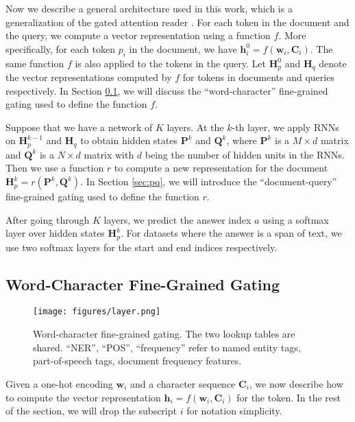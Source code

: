 \documentclass{article} \usepackage{iclr2017_conference,times}
\begin{document}
Now we describe a general architecture used in this work, which is a generalization of the gated attention reader \citep{dhingra2016gated}. For each token in the document and the query, we compute a vector representation using a function $f$. More specifically, for each token $p_i$ in the document, we have $\mathbf{h}_i^0 = f(\mathbf{w}_i, \mathbf{C}_i)$. The same function $f$ is also applied to the tokens in the query. Let $\mathbf{H}_p^0$ and $\mathbf{H}_q$ denote the vector representations computed by $f$ for tokens in documents and queries respectively. In Section \ref{sec:wc}, we will discuss the ``word-character'' fine-grained gating used to define the function $f$. 

Suppose that we have a network of $K$ layers. At the $k$-th layer, we apply RNNs on $\mathbf{H}_p^{k - 1}$ and $\mathbf{H}_q$ to obtain hidden states $\mathbf{P}^k$ and $\mathbf{Q}^k$, where $\mathbf{P}^k$ is a $M \times d$ matrix and $\mathbf{Q}^k$ is a $N \times d$ matrix with $d$ being the number of hidden units in the RNNs. Then we use a function $r$ to compute a new representation for the document $\mathbf{H}_p^k = r(\mathbf{P}^k, \mathbf{Q}^k)$. In Section \ref{sec:pq}, we will introduce the ``document-query'' fine-grained gating used to define the function $r$.

After going through $K$ layers, we predict the answer index $a$ using a softmax layer over hidden states $\mathbf{H}_p^k$. For datasets where the answer is a span of text, we use two softmax layers for the start and end indices respectively.




\subsection{Word-Character Fine-Grained Gating} \label{sec:wc}

\begin{figure}[t]
\begin{center}
\texttt{[image: figures/layer.png]}
\end{center}
\caption{\small Word-character fine-grained gating. The two lookup tables are shared. ``NER'', ``POS'', ``frequency'' refer to named entity tags, part-of-speech tags, document frequency features.}
\label{fig:wc}
\end{figure}

Given a one-hot encoding $\mathbf{w}_i$ and a character sequence $\mathbf{C}_i$, we now describe how to compute the vector representation $\mathbf{h}_i = f(\mathbf{w}_i, \mathbf{C}_i)$ for the token. In the rest of the section, we will drop the subscript $i$ for notation simplicity.
\end{document}
